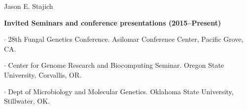 \documentclass[10pt]{article}
\begin{document}
\begin{cv}{\centerline{Jason E. Stajich}}
\begin{cvlistcompact}{\bf Invited Seminars and conference presentations (2015--Present)}
  \item $\cdot$   %
    28th Fungal Genetics Conference. Asilomar Conference Center,
    Pacific Grove, CA. 
  \item $\cdot$ %
    Center for Genome Research and Biocomputing Seminar. Oregon
    State University, Corvallis, OR.
  \item $\cdot$ %
    Dept of Microbiology and Molecular Genetics. Oklahoma State University, Stillwater, OK. \\    
%

\end{cvlistcompact}
\end{cv}
\end{document}
